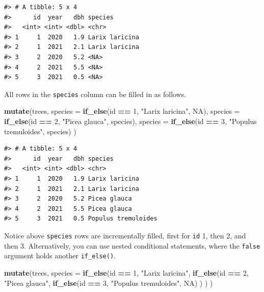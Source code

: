 \documentclass[
  11pt,
]{krantz}
\newenvironment{Shaded}{\begin{snugshade}}{\end{snugshade}}
\newcommand{\DataTypeTok}[1]{\textcolor[rgb]{0.13,0.29,0.53}{#1}}
\newcommand{\DecValTok}[1]{\textcolor[rgb]{0.00,0.00,0.81}{#1}}
\newcommand{\KeywordTok}[1]{\textcolor[rgb]{0.13,0.29,0.53}{\textbf{#1}}}
\newcommand{\NormalTok}[1]{#1}
\newcommand{\OperatorTok}[1]{\textcolor[rgb]{0.81,0.36,0.00}{\textbf{#1}}}
\newcommand{\OtherTok}[1]{\textcolor[rgb]{0.56,0.35,0.01}{#1}}
\newcommand{\StringTok}[1]{\textcolor[rgb]{0.31,0.60,0.02}{#1}}
\theoremstyle{definition}
\theoremstyle{definition}
\theoremstyle{definition}
\theoremstyle{definition}
\theoremstyle{remark}
\begin{document}
\begin{verbatim}
#> # A tibble: 5 x 4
#>      id  year   dbh species       
#>   <int> <int> <dbl> <chr>         
#> 1     1  2020   1.9 Larix laricina
#> 2     1  2021   2.1 Larix laricina
#> 3     2  2020   5.2 <NA>          
#> 4     2  2021   5.5 <NA>          
#> 5     3  2021   0.5 <NA>
\end{verbatim}

All rows in the \texttt{species} column can be filled in as follows.

\begin{Shaded}
\begin{Highlighting}[]
\KeywordTok{mutate}\NormalTok{(trees, }
       \DataTypeTok{species =} \KeywordTok{if\_else}\NormalTok{(id }\OperatorTok{==}\StringTok{ }\DecValTok{1}\NormalTok{, }\StringTok{"Larix laricina"}\NormalTok{, }\OtherTok{NA}\NormalTok{),}
       \DataTypeTok{species =} \KeywordTok{if\_else}\NormalTok{(id }\OperatorTok{==}\StringTok{ }\DecValTok{2}\NormalTok{, }\StringTok{"Picea glauca"}\NormalTok{, species),}
       \DataTypeTok{species =} \KeywordTok{if\_else}\NormalTok{(id }\OperatorTok{==}\StringTok{ }\DecValTok{3}\NormalTok{, }\StringTok{"Populus tremuloides"}\NormalTok{, species)}
\NormalTok{       )}
\end{Highlighting}
\end{Shaded}

\begin{verbatim}
#> # A tibble: 5 x 4
#>      id  year   dbh species            
#>   <int> <int> <dbl> <chr>              
#> 1     1  2020   1.9 Larix laricina     
#> 2     1  2021   2.1 Larix laricina     
#> 3     2  2020   5.2 Picea glauca       
#> 4     2  2021   5.5 Picea glauca       
#> 5     3  2021   0.5 Populus tremuloides
\end{verbatim}

Notice above \texttt{species} rows are incrementally filled, first for \texttt{id} 1, then 2, and then 3. Alternatively, you can use nested conditional statements, where the \texttt{false} argument holds another \texttt{if\_else()}.

\begin{Shaded}
\begin{Highlighting}[]
\KeywordTok{mutate}\NormalTok{(trees, }
       \DataTypeTok{species =} \KeywordTok{if\_else}\NormalTok{(id }\OperatorTok{==}\StringTok{ }\DecValTok{1}\NormalTok{, }
                         \StringTok{"Larix laricina"}\NormalTok{,}
                         \KeywordTok{if\_else}\NormalTok{(id }\OperatorTok{==}\StringTok{ }\DecValTok{2}\NormalTok{, }
                                 \StringTok{"Picea glauca"}\NormalTok{,}
                                 \KeywordTok{if\_else}\NormalTok{(id }\OperatorTok{==}\StringTok{ }\DecValTok{3}\NormalTok{, }
                                         \StringTok{"Populus tremuloides"}\NormalTok{, }\OtherTok{NA}\NormalTok{)}
\NormalTok{                                 )}
\NormalTok{                         )}
\NormalTok{       )}
\end{Highlighting}
\end{Shaded}
\end{document}
